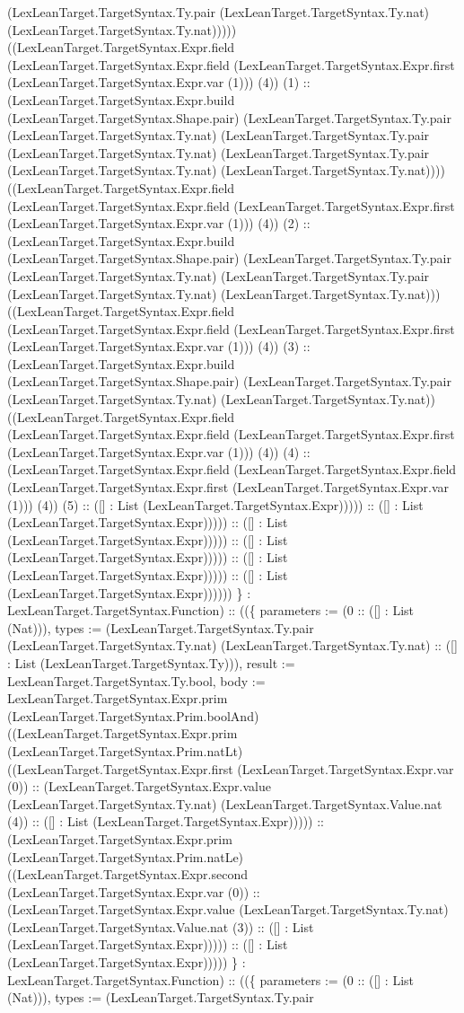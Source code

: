 \documentclass[11pt]{article}
\begin{document}
(LexLeanTarget.TargetSyntax.Ty.pair (LexLeanTarget.TargetSyntax.Ty.nat) (LexLeanTarget.TargetSyntax.Ty.nat))))) ((LexLeanTarget.TargetSyntax.Expr.field (LexLeanTarget.TargetSyntax.Expr.field (LexLeanTarget.TargetSyntax.Expr.first (LexLeanTarget.TargetSyntax.Expr.var (1))) (4)) (1) :: (LexLeanTarget.TargetSyntax.Expr.build (LexLeanTarget.TargetSyntax.Shape.pair) (LexLeanTarget.TargetSyntax.Ty.pair (LexLeanTarget.TargetSyntax.Ty.nat) (LexLeanTarget.TargetSyntax.Ty.pair (LexLeanTarget.TargetSyntax.Ty.nat) (LexLeanTarget.TargetSyntax.Ty.pair (LexLeanTarget.TargetSyntax.Ty.nat) (LexLeanTarget.TargetSyntax.Ty.nat)))) ((LexLeanTarget.TargetSyntax.Expr.field (LexLeanTarget.TargetSyntax.Expr.field (LexLeanTarget.TargetSyntax.Expr.first (LexLeanTarget.TargetSyntax.Expr.var (1))) (4)) (2) :: (LexLeanTarget.TargetSyntax.Expr.build (LexLeanTarget.TargetSyntax.Shape.pair) (LexLeanTarget.TargetSyntax.Ty.pair (LexLeanTarget.TargetSyntax.Ty.nat) (LexLeanTarget.TargetSyntax.Ty.pair (LexLeanTarget.TargetSyntax.Ty.nat) (LexLeanTarget.TargetSyntax.Ty.nat))) ((LexLeanTarget.TargetSyntax.Expr.field (LexLeanTarget.TargetSyntax.Expr.field (LexLeanTarget.TargetSyntax.Expr.first (LexLeanTarget.TargetSyntax.Expr.var (1))) (4)) (3) :: (LexLeanTarget.TargetSyntax.Expr.build (LexLeanTarget.TargetSyntax.Shape.pair) (LexLeanTarget.TargetSyntax.Ty.pair (LexLeanTarget.TargetSyntax.Ty.nat) (LexLeanTarget.TargetSyntax.Ty.nat)) ((LexLeanTarget.TargetSyntax.Expr.field (LexLeanTarget.TargetSyntax.Expr.field (LexLeanTarget.TargetSyntax.Expr.first (LexLeanTarget.TargetSyntax.Expr.var (1))) (4)) (4) :: (LexLeanTarget.TargetSyntax.Expr.field (LexLeanTarget.TargetSyntax.Expr.field (LexLeanTarget.TargetSyntax.Expr.first (LexLeanTarget.TargetSyntax.Expr.var (1))) (4)) (5) :: ([] : List (LexLeanTarget.TargetSyntax.Expr))))) :: ([] : List (LexLeanTarget.TargetSyntax.Expr))))) :: ([] : List (LexLeanTarget.TargetSyntax.Expr))))) :: ([] : List (LexLeanTarget.TargetSyntax.Expr))))) :: ([] : List (LexLeanTarget.TargetSyntax.Expr))))) :: ([] : List (LexLeanTarget.TargetSyntax.Expr)))))) \} : LexLeanTarget.TargetSyntax.Function) :: ((\{ parameters := (0 :: ([] : List (Nat))), types := (LexLeanTarget.TargetSyntax.Ty.pair (LexLeanTarget.TargetSyntax.Ty.nat) (LexLeanTarget.TargetSyntax.Ty.nat) :: ([] : List (LexLeanTarget.TargetSyntax.Ty))), result := LexLeanTarget.TargetSyntax.Ty.bool, body := LexLeanTarget.TargetSyntax.Expr.prim (LexLeanTarget.TargetSyntax.Prim.boolAnd) ((LexLeanTarget.TargetSyntax.Expr.prim (LexLeanTarget.TargetSyntax.Prim.natLt) ((LexLeanTarget.TargetSyntax.Expr.first (LexLeanTarget.TargetSyntax.Expr.var (0)) :: (LexLeanTarget.TargetSyntax.Expr.value (LexLeanTarget.TargetSyntax.Ty.nat) (LexLeanTarget.TargetSyntax.Value.nat (4)) :: ([] : List (LexLeanTarget.TargetSyntax.Expr))))) :: (LexLeanTarget.TargetSyntax.Expr.prim (LexLeanTarget.TargetSyntax.Prim.natLe) ((LexLeanTarget.TargetSyntax.Expr.second (LexLeanTarget.TargetSyntax.Expr.var (0)) :: (LexLeanTarget.TargetSyntax.Expr.value (LexLeanTarget.TargetSyntax.Ty.nat) (LexLeanTarget.TargetSyntax.Value.nat (3)) :: ([] : List (LexLeanTarget.TargetSyntax.Expr))))) :: ([] : List (LexLeanTarget.TargetSyntax.Expr))))) \} : LexLeanTarget.TargetSyntax.Function) :: ((\{ parameters := (0 :: ([] : List (Nat))), types := (LexLeanTarget.TargetSyntax.Ty.pair 
\end{document}
